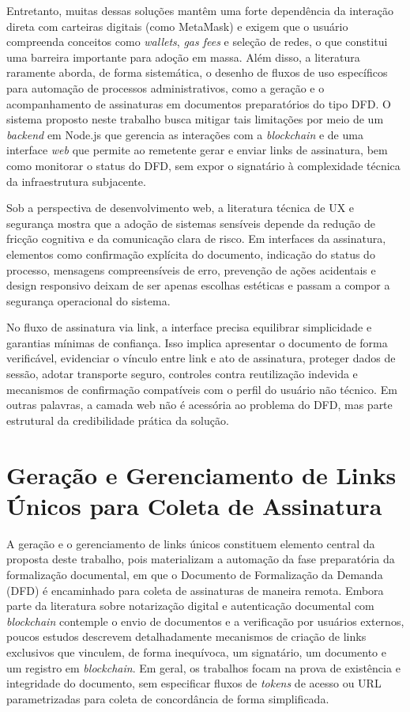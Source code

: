 \documentclass[
    12pt,
    a4paper,
    oneside,
    chapter=TITLE,
    section=TITLE,
    subsection=TITLE,
    subsubsection=TITLE,
    sumario=tradicional,
    english,
    brazil
]{abntex2}
\begin{document}
Entretanto, muitas dessas soluções mantêm uma forte dependência da
interação direta com carteiras digitais (como MetaMask) e exigem que
o usuário compreenda conceitos como \emph{wallets}, \emph{gas fees} e
seleção de redes, o que constitui uma barreira importante para adoção
em massa. Além disso, a literatura raramente aborda, de forma
sistemática, o desenho de fluxos de uso específicos para automação de
processos administrativos, como a geração e o acompanhamento de
assinaturas em documentos preparatórios do tipo DFD. O sistema
proposto neste trabalho busca mitigar tais limitações por meio de um
\emph{backend} em Node.js que gerencia as interações com a
\emph{blockchain} e de uma interface \emph{web} que permite ao
remetente gerar e enviar links de assinatura, bem como monitorar o
status do DFD, sem expor o signatário à complexidade técnica da
infraestrutura subjacente.

Sob a perspectiva de desenvolvimento web, a literatura técnica de UX
e segurança mostra que a adoção de sistemas sensíveis depende da
redução de fricção cognitiva e da comunicação clara de risco. Em
interfaces da assinatura, elementos como confirmação explícita do
documento, indicação do status do processo, mensagens compreensíveis
de erro, prevenção de ações acidentais e design responsivo deixam de
ser apenas escolhas estéticas e passam a compor a segurança
operacional do sistema.

No fluxo de assinatura via link, a interface precisa equilibrar
simplicidade e garantias mínimas de confiança. Isso implica
apresentar o documento de forma verificável, evidenciar o vínculo
entre link e ato de assinatura, proteger dados de sessão, adotar
transporte seguro, controles contra reutilização indevida e
mecanismos de confirmação compatíveis com o perfil do usuário não
técnico. Em outras palavras, a camada web não é acessória ao problema
do DFD, mas parte estrutural da credibilidade prática da solução.

\section{Geração e Gerenciamento de Links Únicos para Coleta de Assinatura}
\label{sec:links}

A geração e o gerenciamento de links únicos constituem elemento
central da proposta deste trabalho, pois materializam a automação da
fase preparatória da formalização documental, em que o Documento de
Formalização da Demanda (DFD) é encaminhado para coleta de assinaturas
de maneira remota. Embora parte da literatura sobre notarização digital
e autenticação documental com \emph{blockchain} contemple o envio de
documentos e a verificação por usuários externos, poucos estudos
descrevem detalhadamente mecanismos de criação de links exclusivos
que vinculem, de forma inequívoca, um signatário, um documento e um
registro em \emph{blockchain}. Em geral, os trabalhos focam na prova
de existência e integridade do documento, sem especificar fluxos de
\emph{tokens} de acesso ou URL parametrizadas para coleta de
concordância de forma simplificada.
\end{document}
